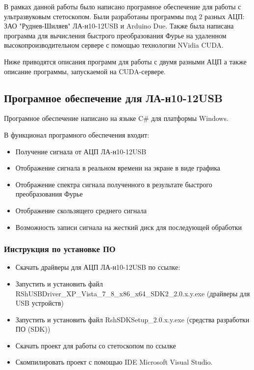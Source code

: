 \documentclass[../paper.tex]{subfiles}
\begin{document}
В рамках данной работы было написано програмное обеспечение для работы с ультразвуковым стетоскопом. Были разработаны программы под 2 разных АЦП: ЗАО "Руднев-Шиляев" ЛА-н10-12USB и Arduino Due. Также была написана программа для вычисления быстрого преобразования Фурье на удаленном высокопроизводительном сервере с помощью технологии NVidia CUDA.

Ниже приводятся описания программ для работы с двумя разными АЦП а также описание программы, запускаемой на CUDA-сервере.

\subsection{Програмное обеспечение для ЛА-н10-12USB}

Програмное обеспечение написано на языке C\# для платформы Windows.

В функционал програмного обеспечения входит:
\begin{itemize}
  \item Получение сигнала от АЦП ЛА-н10-12USB
  \item Отображение сигнала в реальном времени на экране в виде графика
  \item Отображение спектра сигнала полученного в результате быстрого преобразования Фурье
  \item Отображение скользящего среднего сигнала
  \item Возможность записи сигнала на жесткий диск для последующей обработки
\end{itemize}

\subsubsection{Инструкция по установке ПО}
\begin{itemize}
  \item Скачать драйверы для АЦП ЛА-н10-12USB по ссылке:\cite{rudshel-drivers}\\ 
  \item Запустить и установить файл RShUSBDriver\_XP\_Vista\_7\_8\_x86\_x64\_SDK2\_2.0.x.y.exe (драйверы для USB устройств)
  \item Запустить и установить файл RshSDKSetup\_2.0.x.y.exe (средства разработки ПО (SDK))
  \item Скачать проект для работы со стетоскопом по ссылке \cite{app-rudshel}
  \item Скомпилировать проект с помощью IDE Microsoft Visual Studio.
\end{itemize}
\end{document}
